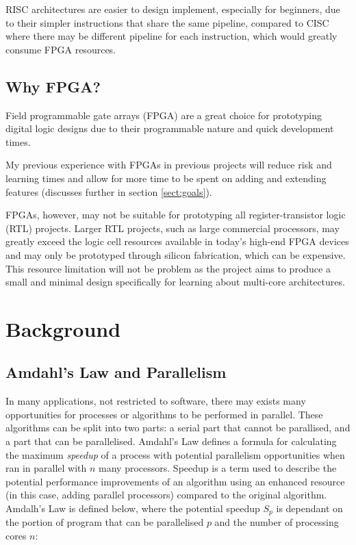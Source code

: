 RISC architectures are easier to design implement, especially for beginners, due to their simpler instructions that share the same pipeline, compared to CISC where there may be different pipeline for each instruction, which would greatly consume FPGA resources.

\section{Why FPGA?}
Field programmable gate arrays (FPGA) are a great choice for prototyping digital logic designs due to their programmable nature and quick development times. 

My previous experience with FPGAs in previous projects will reduce risk and learning times and allow for more time to be spent on adding and extending features (discusses further in section \ref{sect:goals}).

FPGAs, however, may not be suitable for prototyping all register-transistor logic (RTL) projects. Larger RTL projects, such as large commercial processors, may greatly exceed the logic cell resources available in today's high-end FPGA devices and may only be prototyped through silicon fabrication, which can be expensive. This resource limitation will not be problem as the project aims to produce a small and minimal design specifically for learning about multi-core architectures.

\chapter{Background}
{%
\startcontents[chapters]
}

\section{Amdahl's Law and Parallelism}
In many applications, not restricted to software, there may exists many opportunities for processes or algorithms to be performed in parallel. These algorithms can be split into two parts: a serial part that cannot be parallised, and a part that can be parallelised. Amdahl's Law defines a formula for calculating the maximum \textit{speedup} of a process with potential parallelism opportunities when ran in parallel with $n$ many processors. Speedup is a term used to describe the potential performance improvements of an algorithm using an enhanced resource (in this case, adding parallel processors) compared to the original algorithm. Amdalh's Law is defined below, where the potential speedup $S_p$ is dependant on the portion of program that can be parallelised $p$ and the number of processing cores $n$:

